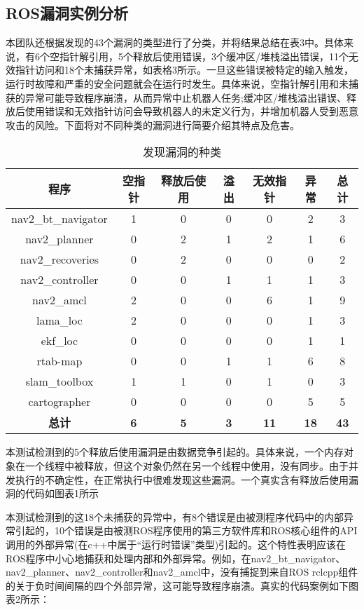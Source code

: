 \subsection{ROS漏洞实例分析}
本团队还根据发现的43个漏洞的类型进行了分类，并将结果总结在表3中。具体来说，有6个空指针解引用，5个释放后使用错误，3个缓冲区/堆栈溢出错误，11个无效指针访问和18个未捕获异常，如表格3所示。一旦这些错误被特定的输入触发，运行时故障和严重的安全问题就会在运行时发生。具体来说，空指针解引用和未捕获的异常可能导致程序崩溃，从而异常中止机器人任务;缓冲区/堆栈溢出错误、释放后使用错误和无效指针访问会导致机器人的未定义行为，并增加机器人受到恶意攻击的风险。下面将对不同种类的漏洞进行简要介绍其特点及危害。
\begin{table}[H]
	\small
	\caption{发现漏洞的种类}
	\centering
	\begin{tabular}{ccccccc}
		\hline
		\textbf{程序} & \textbf{空指针} & \textbf{释放后使用} & \textbf{溢出} & \textbf{无效指针} & \textbf{异常} & \textbf{总计} \\
		\hline
		nav2\_bt\_navigator & 1 & 0 & 0 & 0 & 2 & 3 \\
		nav2\_planner & 0 & 2 & 1 & 2 & 1 & 6 \\
		nav2\_recoveries & 0 & 2 & 0 & 0 & 0 & 2 \\
		nav2\_controller & 0 & 0 & 1 & 1 & 1 & 3 \\
		nav2\_amcl & 2 & 0 & 0 & 6 & 1 & 9 \\
		lama\_loc & 2 & 0 & 0 & 0 & 1 & 3 \\
		ekf\_loc & 0 & 0 & 0 & 0 & 1 & 1 \\
		rtab-map & 0 & 0 & 1 & 1 & 6 & 8 \\
		slam\_toolbox & 1 & 1 & 0 & 1 & 0 & 3 \\
		cartographer & 0 & 0 & 0 & 0 & 5 & 5 \\
		\textbf{总计} & \textbf{6} & \textbf{5} & \textbf{3} & \textbf{11} & \textbf{18} & \textbf{43} \\
		\hline
	\end{tabular}
\end{table}

本测试检测到的5个释放后使用漏洞是由数据竞争引起的。具体来说，一个内存对象在一个线程中被释放，但这个对象仍然在另一个线程中使用，没有同步。由于并发执行的不确定性，在正常执行中很难发现这些漏洞。一个真实含有释放后使用漏洞的代码如图表1所示

本测试检测到的这18个未捕获的异常中，有8个错误是由被测程序代码中的内部异常引起的，10个错误是由被测ROS程序使用的第三方软件库和ROS核心组件的API调用的外部异常(在c++中属于``运行时错误''类型)引起的。这个特性表明应该在ROS程序中小心地捕获和处理内部和外部异常。例如，在nav2\_bt\_navigator、nav2\_planner、nav2\_controller和nav2\_amcl中，没有捕捉到来自ROS
rclcpp组件的关于负时间间隔的四个外部异常，这可能导致程序崩溃。真实的代码案例如下图表2所示：

